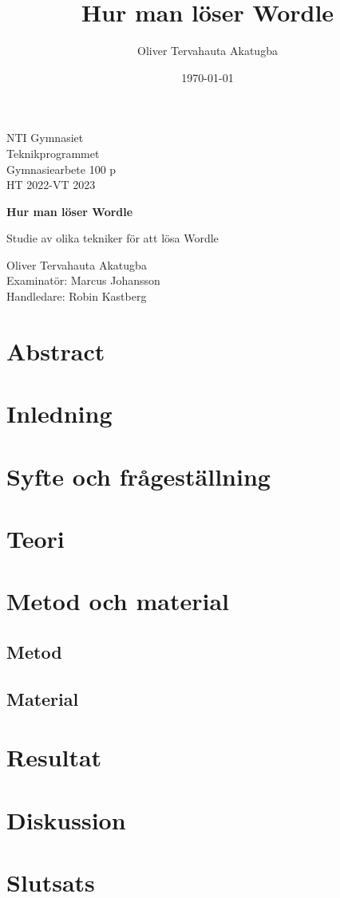 \documentclass{article}
\title{Hur man löser Wordle}
\author{Oliver Tervahauta Akatugba}
\date{\today}
\begin{document}
\begin{titlepage}
\noindent
NTI Gymnasiet \\
Teknikprogrammet \\
Gymnasiearbete 100 p \\
HT 2022-VT 2023
\begin{center}
\vspace*{1cm}
\Huge
\textbf{Hur man löser Wordle}
\vspace{0.5cm}

\large
Studie av olika tekniker för att lösa Wordle
\end{center}

\vfill
\normalsize
\noindent
Oliver Tervahauta Akatugba\\
Examinatör: Marcus Johansson\\
Handledare: Robin Kastberg
\end{titlepage}

\section*{Abstract}

\tableofcontents

\section{Inledning}
\section{Syfte och frågeställning}
\section{Teori}
\section{Metod och material}
\subsection{Metod}
\subsection{Material}
\section{Resultat}
\section{Diskussion}
\section{Slutsats}
\end{document}
